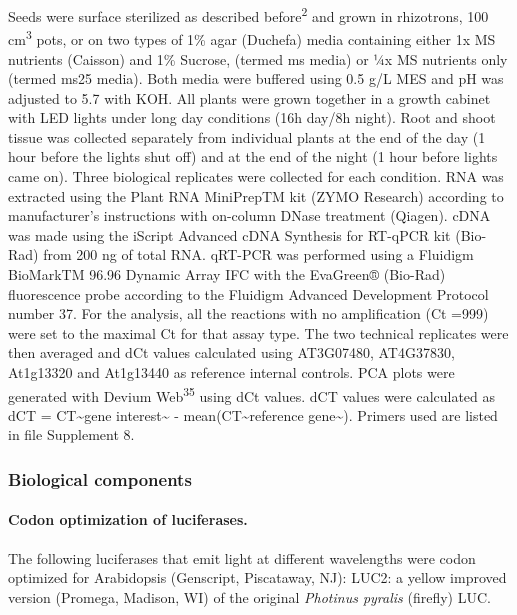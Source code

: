 \documentclass[]{article}
\begin{document}
Seeds were surface sterilized as described before\textsuperscript{2} and
grown in rhizotrons, 100 cm\textsuperscript{3} pots, or on two types of
1\% agar (Duchefa) media containing either 1x MS nutrients (Caisson) and
1\% Sucrose, (termed ms media) or ¼x MS nutrients only (termed ms25
media). Both media were buffered using 0.5 g/L MES and pH was adjusted
to 5.7 with KOH. All plants were grown together in a growth cabinet with
LED lights under long day conditions (16h day/8h night). Root and shoot
tissue was collected separately from individual plants at the end of the
day (1 hour before the lights shut off) and at the end of the night (1
hour before lights came on). Three biological replicates were collected
for each condition. RNA was extracted using the Plant RNA MiniPrepTM kit
(ZYMO Research) according to manufacturer's instructions with on-column
DNase treatment (Qiagen). cDNA was made using the iScript Advanced cDNA
Synthesis for RT-qPCR kit (Bio-Rad) from 200 ng of total RNA. qRT-PCR
was performed using a Fluidigm BioMarkTM 96.96 Dynamic Array IFC with
the EvaGreen® (Bio-Rad) fluorescence probe according to the Fluidigm
Advanced Development Protocol number 37. For the analysis, all the
reactions with no amplification (Ct =999) were set to the maximal Ct for
that assay type. The two technical replicates were then averaged and dCt
values calculated using AT3G07480, AT4G37830, At1g13320 and At1g13440 as
reference internal controls. PCA plots were generated with Devium
Web\textsuperscript{35} using dCt values. dCT values were calculated as
dCT = CT\textasciitilde{}gene interest\textasciitilde{} -
mean(CT\textasciitilde{}reference gene\textasciitilde{}). Primers used
are listed in file Supplement 8.

\subsubsection{Biological components}\label{biological-components}

\paragraph{Codon optimization of
luciferases.}\label{codon-optimization-of-luciferases.}

The following luciferases that emit light at different wavelengths were
codon optimized for Arabidopsis (Genscript, Piscataway, NJ): LUC2: a
yellow improved version (Promega, Madison, WI) of the original
\emph{Photinus pyralis} (firefly) LUC.
\end{document}
